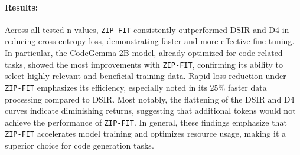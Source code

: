 \paragraph{Results:} Across all tested n values, \texttt{ZIP-FIT} consistently outperformed DSIR and D4 in reducing cross-entropy loss, demonstrating faster and more effective fine-tuning. 
In particular, the CodeGemma-2B model, already optimized for code-related tasks, showed the most improvements with \texttt{ZIP-FIT}, confirming its ability to select highly relevant and beneficial training data. 
Rapid loss reduction under \texttt{ZIP-FIT} emphasizes its efficiency, especially noted in its 25\% faster data processing compared to DSIR. 
Most notably, the flattening of the DSIR and D4 curves indicate diminishing returns, suggesting that additional tokens would not achieve the performance of \texttt{ZIP-FIT}. 
In general, these findings emphasize that \texttt{ZIP-FIT} accelerates model training and optimizes resource usage, making it a superior choice for code generation tasks.
